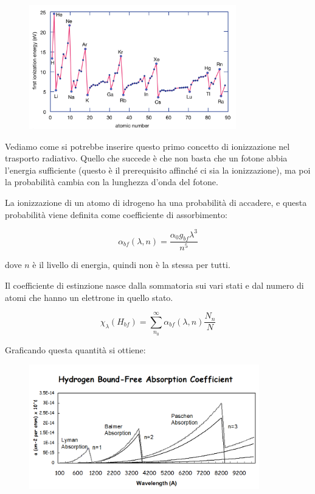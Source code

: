\begin{figure}[H]
  \centering
  \includegraphics[width=9cm]{immagini/potenziale_ionizzazione.png}
\end{figure}

Vediamo come si potrebbe inserire questo primo concetto di ionizzazione nel trasporto radiativo. Quello che succede è che non basta che un fotone abbia l'energia sufficiente (questo è il prerequisito affinché ci sia la ionizzazione), ma poi la probabilità cambia con la lunghezza d'onda del fotone.

La ionizzazione di un atomo di idrogeno ha una probabilità di accadere, e questa probabilità viene definita come coefficiente di assorbimento:

$$\alpha_{bf}(\lambda,n)=\frac{\alpha_0 g_{bf} \lambda^3}{n^5}$$

dove $n$ è il livello di energia, quindi non è la stessa per tutti.

Il coefficiente di estinzione nasce dalla sommatoria sui vari stati e dal numero di atomi che hanno un elettrone in quello stato.

$${\chi_{\lambda}}(H_{bf})=\sum_{n_0}^{\infty} {\alpha_{bf}}({\lambda},n)\frac{N_n}{N}$$


Graficando questa quantità si ottiene:
    
\begin{figure}[H]
  \centering
  \includegraphics[width=10cm]{immagini/coefficiente_assorbimento_legato_libero_idrogeno.png}
  \label{fig: coefficiente di assorbimento }
\end{figure}


